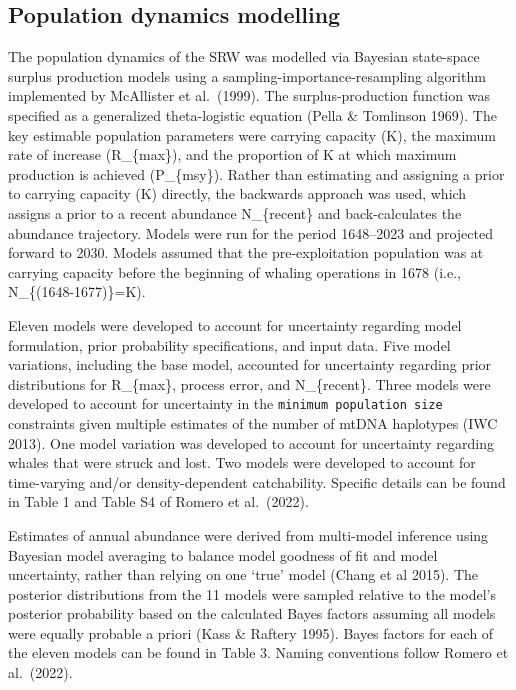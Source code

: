 \documentclass[
]{article}
\begin{document}
\hypertarget{population-dynamics-modelling}{%
\subsection{Population dynamics
modelling}\label{population-dynamics-modelling}}

The population dynamics of the SRW was modelled via Bayesian state-space
surplus production models using a sampling-importance-resampling
algorithm implemented by McAllister et al.~(1999). The
surplus-production function was specified as a generalized
theta-logistic equation (Pella \& Tomlinson 1969). The key estimable
population parameters were carrying capacity (K), the maximum rate of
increase (R\_\{max\}), and the proportion of K at which maximum
production is achieved (P\_\{msy\}). Rather than estimating and
assigning a prior to carrying capacity (K) directly, the backwards
approach was used, which assigns a prior to a recent abundance
N\_\{recent\} and back-calculates the abundance trajectory. Models were
run for the period 1648--2023 and projected forward to 2030. Models
assumed that the pre-exploitation population was at carrying capacity
before the beginning of whaling operations in 1678 (i.e.,
N\_\{(1648-1677)\}=K).

Eleven models were developed to account for uncertainty regarding model
formulation, prior probability specifications, and input data. Five
model variations, including the base model, accounted for uncertainty
regarding prior distributions for R\_\{max\}, process error, and
N\_\{recent\}. Three models were developed to account for uncertainty in
the \texttt{minimum\ population\ size} constraints given multiple
estimates of the number of mtDNA haplotypes (IWC 2013). One model
variation was developed to account for uncertainty regarding whales that
were struck and lost. Two models were developed to account for
time-varying and/or density-dependent catchability. Specific details can
be found in Table 1 and Table S4 of Romero et al.~(2022).

Estimates of annual abundance were derived from multi-model inference
using Bayesian model averaging to balance model goodness of fit and
model uncertainty, rather than relying on one `true' model (Chang et al
2015). The posterior distributions from the 11 models were sampled
relative to the model's posterior probability based on the calculated
Bayes factors assuming all models were equally probable a priori (Kass
\& Raftery 1995). Bayes factors for each of the eleven models can be
found in Table 3. Naming conventions follow Romero et al.~(2022).
\end{document}
